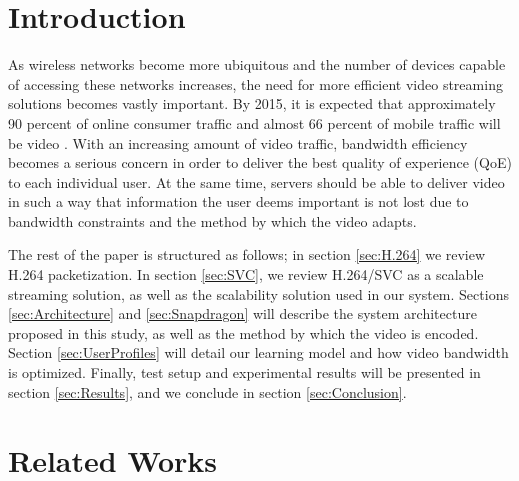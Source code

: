 
\section{Introduction}
\label{sec:Intro}

As wireless networks become more ubiquitous and the number of devices capable of accessing these networks increases, the need for more efficient video streaming solutions becomes vastly important. By 2015, it is expected that approximately 90 percent of online consumer traffic and almost 66 percent of mobile traffic will be video \cite{HASQoE}. With an increasing amount of video traffic, bandwidth efficiency becomes a serious concern in order to deliver the best quality of experience (QoE) to each individual user. At the same time, servers should be able to deliver video in such a way that information the user deems important is not lost due to bandwidth constraints and the method by which the video adapts.



The rest of the paper is structured as follows; in section \ref{sec:H.264} we review H.264 packetization. In section \ref{sec:SVC}, we review H.264/SVC as a scalable streaming solution, as well as the scalability solution used in our system. Sections \ref{sec:Architecture} and \ref{sec:Snapdragon} will describe the system architecture proposed in this study, as well as the method by which the video is encoded. Section \ref{sec:UserProfiles} will detail our learning model and how video bandwidth is optimized. Finally, test setup and experimental results will be presented in section \ref{sec:Results}, and we conclude in section \ref{sec:Conclusion}.

\section{Related Works}
\label{sec:RelatedWorks}

